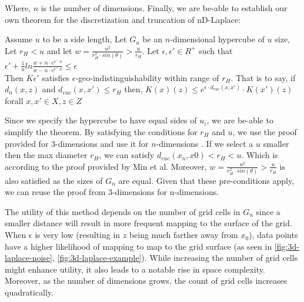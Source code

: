 Where, $n$ is the number of dimensions.
\newpage
Finally, we are be-able to establish our own theorem for the discretization and truncation of nD-Laplace:
\begin{theorem}
  Assume $u$ to be a side length, Let $G_u$ be an $n$-dimensional hypercube of $u$ size, Let $r_H < u$ and let $w = \frac{u^2}{r^2_H \cdot sin (\theta)} > \frac{u}{r_H}.$ Let $\epsilon, \epsilon' \in R^+$ such that \\
  $\epsilon' + \frac{1}{u} ln \frac{w + n \cdot e^{\epsilon' \cdot u}}{w - n \cdot e^{\epsilon' \cdot u}} \leq \epsilon$ \\
  Then $K\epsilon'$ satisfies $\epsilon$-geo-indistinguishability within range
  of $r_H$. That is to say, if $d_n(x, z)$ and $d_{euc}(x, x') \leq r_H$ then,
  $K(x)(z) \leq e^{\epsilon \cdot d_{euc} (x, x')} \cdot K(x')(z)$ forall $x, x' \in X, z \in Z$ \citep{chatzikokolakis_constructing_2015}
\end{theorem}
Since we specify the hypercube to have equal sides of $u_i$, we are be-able to simplify the theorem.
By satisfying the conditions for $r_H$ and $u$, we use the proof provided for 3-dimensions and use it for $n$-dimensions \citep{9646489}.
If we select a $u$ smaller then the max diameter $r_H$, we can satisfy $d_{euc}(x_n, x0) < r_H < u$. Which is according to the proof provided by Min et al.
Moreover, $w = \frac{u^2}{r_H^2 \cdot sin(\theta)} > \frac{u}{r_H}$ is also satisfied as the sizes of $G_n$ are equal.
Given that these pre-conditions apply, we can reuse the proof from 3-dimensions for n-dimensions. \newline

The utility of this method depends on the number of grid cells in $G_n$ since a smaller distance will result in more frequent mapping to the surface of the grid.
When $\epsilon$ is very low (resulting in $z$ being much farther away from $x_0$), data points have a higher likelihood of mapping to map to the grid surface 
(as seen in \ref{fig:3d-laplace-noise}, \ref{fig:3d-laplace-example}). 
While increasing the number of grid cells might enhance utility, it also leads to a notable rise in space complexity. 
Moreover, as the number of dimensions grows, the count of grid cells increases quadratically.

